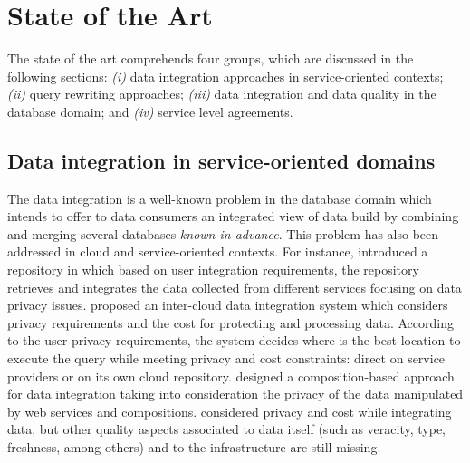 \section{State of the Art}
%
The state of the art comprehends four groups, which are discussed in the following sections: 
\textit{(i)} data integration approaches in service-oriented contexts;
\textit{(ii)} query rewriting approaches;
\textit{(iii)} data integration and data quality in the database domain; and \textit{(iv)} service level agreements.

\subsection{Data integration in service-oriented domains}

The data integration is a well-known problem in the database domain which intends to offer to data consumers an integrated view of data 
build by combining and merging several databases \textit{known-in-advance}. 
This problem has also been addressed in cloud and service-oriented contexts.
%
For instance, \cite{YauY08} introduced a repository in which based on user 
integration requirements, the repository retrieves and integrates the data
collected from different services focusing on data privacy issues. 
%
\cite{Tian2010} proposed an inter-cloud data integration system which considers 
privacy requirements and the cost for protecting and processing data. 
According to the user privacy requirements, the system decides where is the best
location to execute the query while meeting privacy and cost constraints:
direct on service providers or on its own cloud repository.
%
\cite{benslimane2013} designed a composition-based approach for data integration
taking into consideration the privacy of the data manipulated by web services and 
compositions.
%
\cite{YauY08,Tian2010,benslimane2013} considered privacy and cost while integrating data, but 
other quality aspects associated to data itself (such as veracity, type, freshness,
among others) and to the infrastructure are still missing.
%


